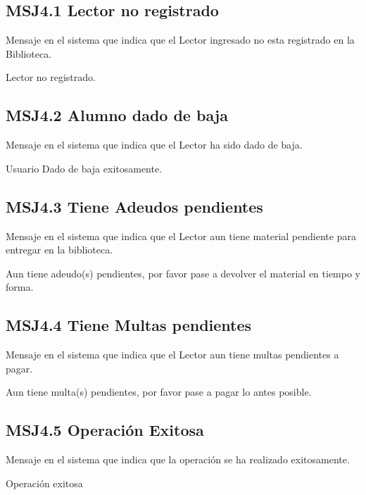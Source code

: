 \subsection{MSJ4.1 Lector no registrado }

Mensaje en el sistema que indica que el Lector ingresado no esta registrado en la Biblioteca.

  \noindent Lector no registrado.
 
 \subsection{MSJ4.2 Alumno dado de baja }

Mensaje en el sistema que indica que el Lector ha sido dado de baja.

  \noindent Usuario Dado de baja exitosamente.
  
  \subsection{MSJ4.3 Tiene Adeudos pendientes }

Mensaje en el sistema que indica que el Lector aun tiene material pendiente para entregar en la biblioteca.

  \noindent Aun tiene adeudo(s) pendientes, por favor pase a devolver el material en tiempo y forma. 

  \subsection{MSJ4.4 Tiene Multas pendientes }

Mensaje en el sistema que indica que el Lector aun tiene multas pendientes a pagar.

  \noindent Aun tiene multa(s) pendientes, por favor pase a pagar lo antes posible.
  
    \subsection{MSJ4.5 Operación Exitosa }

Mensaje en el sistema que indica que la operación se ha realizado exitosamente.

  \noindent Operación exitosa
  
